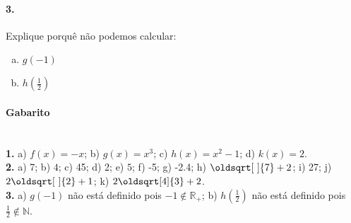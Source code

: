\documentclass[a4paper,12pt]{article}
\renewcommand*{\sqrt}[2][\ ]{\oldsqrt[#1]{#2}}
\begin{document}
\begin{multicols}{2}
\begin{multicols*}{2}
\end{multicols*}
 
\paragraph*{3.} Explique porquê não podemos calcular: 
    \begin{enumerate}[a)]
        \item $g(-1)$
        \item $h\left(\frac{1}{2}\right) $
    \end{enumerate}
\end{multicols}
 

\vspace*{\fill}
{\footnotesize
\paragraph*{Gabarito} \hspace*{\fill}\\
\textbf{1.} a) $f(x) = -x$; b) $g(x) = x^3$; c) $h(x) = x^2 - 1$; d) $k(x) = 2$.\\
\textbf{2.} a) 7; b) $4$; c) 45; d) 2; e) $5$; f) -5; g) -2.4; h) $\sqrt{7} + 2$; i) 27; j) $2\sqrt{2} + 1$; k) $2\sqrt[4]{3} + 2$.\\
\textbf{3.} a) $g(-1)$ não está definido pois $-1 \notin \mathbb{R}_{+}$; b) $h\left(\frac{1}{2}\right)$ não está definido pois $\frac{1}{2} \notin \mathbb{N}$.
}
\end{document}
